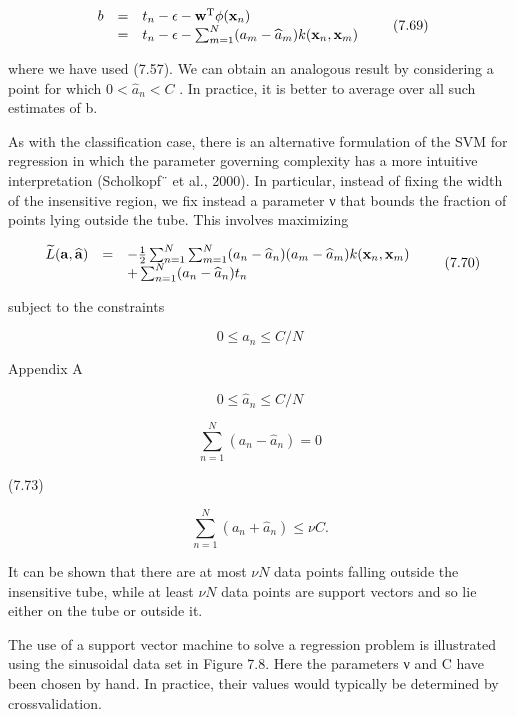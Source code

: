 \documentclass[
  10
]{article}
\begin{document}
\[
\begin{array}{r c l} {b} & {=} & {t _ {n} - \epsilon - {\mathbf w} ^ {\mathrm{T}} \phi ({\mathbf x} _ {n})} \\ & {=} & {t _ {n} - \epsilon - \sum_ {m = 1} ^ {N} (a _ {m} - \widehat {a} _ {m}) k ({\mathbf x} _ {n}, {\mathbf x} _ {m})} \end{array}\tag{7.69}
\]

where we have used (7.57). We can obtain an analogous result by
considering a point for which \(0 < \widehat { a } _ { n } < C\) . In
practice, it is better to average over all such estimates of b.

As with the classification case, there is an alternative formulation of
the SVM for regression in which the parameter governing complexity has a
more intuitive interpretation (Scholkopf¨ et al., 2000). In particular,
instead of fixing the width  of the insensitive region, we fix instead a
parameter ν that bounds the fraction of points lying outside the tube.
This involves maximizing

\[
\begin{array}{r c l} \widetilde {L} (\mathbf {a}, \widehat {\mathbf {a}}) & = & - \frac {1}{2} \sum_ {n = 1} ^ {N} \sum_ {m = 1} ^ {N} (a _ {n} - \widehat {a} _ {n}) (a _ {m} - \widehat {a} _ {m}) k (\mathbf {x} _ {n}, \mathbf {x} _ {m}) \\ & & + \sum_ {n = 1} ^ {N} (a _ {n} - \widehat {a} _ {n}) t _ {n} \end{array}\tag{7.70}
\]

subject to the constraints

\[
0 \leqslant a _ {n} \leqslant C / N\tag{7.71}
\]

Appendix A

\[
0 \leqslant \widehat {a} _ {n} \leqslant C / N
\]

\[
\sum_ {n = 1} ^ {N} (a _ {n} - \widehat {a} _ {n}) = 0\tag{7.72}
\]

(7.73)

\[
\sum_ {n = 1} ^ {N} (a _ {n} + \widehat {a} _ {n}) \leqslant \nu C.\tag{7.74}
\]

It can be shown that there are at most \(\nu N\) data points falling
outside the insensitive tube, while at least \(\nu N\) data points are
support vectors and so lie either on the tube or outside it.

The use of a support vector machine to solve a regression problem is
illustrated using the sinusoidal data set in Figure 7.8. Here the
parameters ν and C have been chosen by hand. In practice, their values
would typically be determined by crossvalidation.
\end{document}
